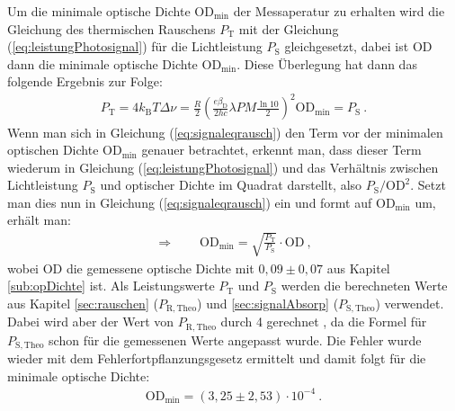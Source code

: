 Um die minimale optische Dichte $\mathrm{OD}_\mathrm{min}$ der Messaperatur zu erhalten wird die Gleichung des thermischen Rauschens $P_\mathrm{T}$ mit der Gleichung (\ref{eq:leistungPhotosignal}) für die Lichtleistung $P_\mathrm{S}$ gleichgesetzt, dabei ist OD dann die minimale optische Dichte $\mathrm{OD}_\mathrm{min}$. Diese Überlegung hat dann das folgende Ergebnis zur Folge:
\begin{gather}
    P_\mathrm{T} = 4 k_\mathrm{B} T \Delta \nu = \frac{R}{2}\left(\frac{e\beta_\mathrm{D}}{2hc}\lambda P M \frac{\ln10}{2}\right)^2 \mathrm{OD}_\mathrm{min}  = P_\mathrm{S}~.
    \label{eq:signaleqrausch}
\end{gather}
Wenn man sich in Gleichung (\ref{eq:signaleqrausch}) den Term vor der minimalen optischen Dichte $\mathrm{OD}_\mathrm{min}$ genauer betrachtet, erkennt man, dass dieser Term wiederum in Gleichung (\ref{eq:leistungPhotosignal}) und das Verhältnis zwischen Lichtleistung $P_\mathrm{S}$ und optischer Dichte im Quadrat darstellt, also $P_\mathrm{S}/\mathrm{OD}^2$. Setzt man dies nun in Gleichung (\ref{eq:signaleqrausch}) ein und formt auf $\mathrm{OD}_\mathrm{min}$ um, erhält man:
\begin{gather}
    \Rightarrow \qquad \boxed{\mathrm{OD}_\mathrm{min} = \sqrt{\frac{P_\mathrm{T}}{P_\mathrm{S}}} \cdot \mathrm{OD}}~,
    \label{eq:minopDichte}
\end{gather}
wobei $\mathrm{OD}$ die gemessene optische Dichte mit $0,09 \pm 0,07$ aus Kapitel \ref{sub:opDichte} ist. Als Leistungswerte $P_\mathrm{T}$ und $P_\mathrm{S}$ werden die berechneten Werte aus Kapitel \ref{sec:rauschen} ($P_\mathrm{R,Theo}$) und \ref{sec:signalAbsorp} ($P_\mathrm{S,Theo}$)  verwendet. Dabei wird aber der Wert von $P_\mathrm{R,Theo}$ durch 4 gerechnet \cite{anleitung}, da die Formel für $P_\mathrm{S,Theo}$ schon für die gemessenen Werte angepasst wurde. Die Fehler wurde wieder mit dem Fehlerfortpflanzungsgesetz ermittelt und damit folgt für die minimale optische Dichte:
\begin{gather}
    \boxed{\mathrm{OD}_\mathrm{min} = (3,25 \pm 2,53) \cdot 10^{-4}}~.
\end{gather}

